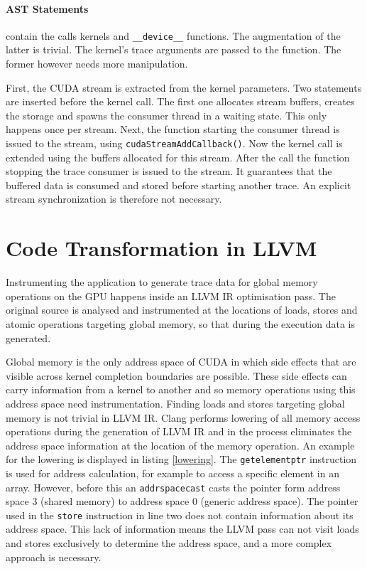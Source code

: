 \paragraph{AST Statements} contain the calls kernels and \verb|__device__| functions. The augmentation of the latter is trivial. The kernel's trace arguments are passed to the function. The former however needs more manipulation.

First, the CUDA stream is extracted from the kernel parameters. Two statements are inserted before the kernel call. The first one allocates stream buffers, creates the storage and spawns the consumer thread in a waiting state. This only happens once per stream. Next, the function starting the consumer thread  is issued to the stream, using \verb|cudaStreamAddCallback()|. Now the kernel call is extended using the buffers allocated for this stream. After the call the function stopping the trace consumer is issued to the stream. It guarantees that
the buffered data is consumed and stored before starting another trace.
An explicit stream synchronization is therefore not necessary.

\section{Code Transformation in LLVM}\label{impl:llvm}
Instrumenting the application to generate trace data for global memory operations on the GPU happens inside an LLVM IR optimisation pass. The original source is analysed and instrumented at the locations of loads, stores and atomic operations targeting global memory, so that during the execution data is generated.

Global memory is the only address space of CUDA in which side effects that are visible across kernel completion boundaries are possible. These side effects can carry information from a kernel to another and so memory operations using this address space need instrumentation. Finding loads and stores targeting global memory is not trivial in LLVM IR. Clang performs lowering of all memory access operations during the generation of LLVM IR and in the process eliminates the address space information at the location of the memory operation. An example for the lowering is displayed in listing \ref{lowering}. The \verb|getelementptr| instruction is used for address calculation, for example to access a specific element in an array. However, before this an \verb|addrspacecast| casts the pointer form address space 3 (shared memory) to address space 0 (generic address space). The pointer used in the \verb|store| instruction in line two does not contain information about its address space. This lack of information means the LLVM pass can not visit loads and stores exclusively to determine the address space, and a more complex approach is necessary.
 
